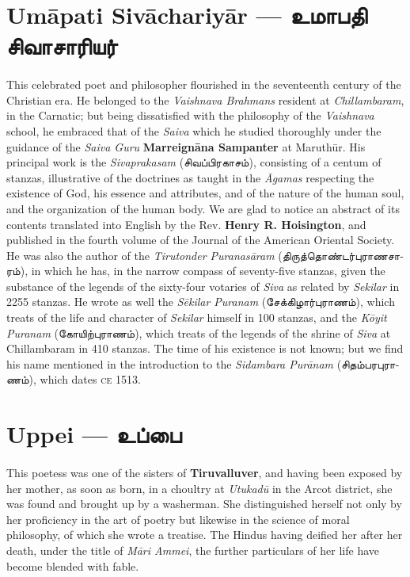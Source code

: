 \documentclass{article}
\newcommand{\TamilText}[1]{\texttamil{#1}}
\newcommand{\TamilBold}[1]{\texttamil{\textbf{#1}}}
\newcommand{\tam}[1]{\TamilText{#1}}
\newcommand{\tambold}[1]{\TamilBold{#1}}
\begin{document}
\section{Um\={a}pati Siv\={a}chariy\={a}r --- \tambold{உமாபதி சிவாசாரியர்}}
\paragraph{}
This celebrated poet and philosopher flourished in the seventeenth century of the Christian era. He belonged to the \emph{Vaishnava Brahmans} resident at \emph{Chillambaram}, in the Carnatic; but being dissatisfied with the philosophy of the \emph{Vaishnava} school, he embraced that of the \emph{Saiva} which he studied thoroughly under the guidance of the \emph{Saiva Guru} \textbf{Marreign\={a}na Sampanter} at Maruth\={u}r. His principal work is the \emph{Sivaprakasam} (\tam{சிவப்பிரகாசம்}), consisting of a centum of stanzas, illustrative of the doctrines as taught in the \emph{\={A}gamas} respecting the existence of God, his essence and attributes, and of the nature of the human soul, and the organization of the human body. We are glad to notice an abstract of its contents translated into English by the Rev. \textbf{Henry R. Hoisington}, and published in the fourth volume of the Journal of the American Oriental Society. He was also the author of the \emph{Tirutonder Puranas\={a}ram} (\tam{திருத்தொண்டர்புராணசாரம்}), in which he has, in the narrow compass of seventy-five stanzas, given the substance of the legends of the sixty-four votaries of \emph{Siva} as related by \emph{Sekilar} in 2255 stanzas. He wrote as well the \emph{S\={e}kilar Puranam} (\tam{சேக்கிழார்புராணம்}), which treats of the life and character of \emph{Sekilar} himself in 100 stanzas, and the \emph{K\={o}yit Puranam} (\tam{கோயிற்புராணம்}), which treats of the legends of the shrine of \emph{Siva} at Chillambaram in 410 stanzas. The time of his existence is not known; but we find his name mentioned in the introduction to the \emph{Sidambara Pur\={a}nam} (\tam{சிதம்பரபுராணம்}), which dates \textsc{ce} 1513.

\section{Uppei --- \tambold{உப்பை}}
\paragraph{}
This poetess was one of the sisters of \textbf{Tiruvalluver}, and having been exposed by her mother, as soon as born, in a choultry at \emph{Utukad\={u}} in the Arcot district, she was found and brought up by a washerman. She distinguished herself not only by her proficiency in the art of poetry but likewise in the science of moral philosophy, of which she wrote a treatise. The Hindus having deified her after her death, under the title of \emph{M\={a}ri Ammei}, the further particulars of her life have become blended with fable.
\end{document}

